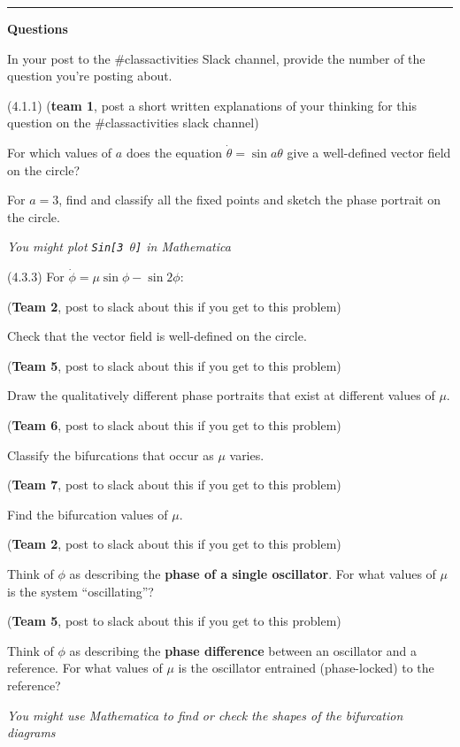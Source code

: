 \documentclass[12pt,letterpaper,noanswers]{exam}
\begin{document}
\vspace{0.2cm}

\hrule
\vspace{0.2cm}

\textbf{Questions}


In your post to the \#classactivities Slack channel, provide the number of the question you're posting about.
\begin{questions}
\item (4.1.1) 
(\textbf{team 1}, post a short written explanations of your thinking for this question on the \#classactivities slack channel)

For which values of $a$ does the equation $\dot{\theta} = \sin a\theta$ give a well-defined vector field on the circle?  

For $a = 3$, find and classify all the fixed points and sketch the phase portrait on the circle.  

\emph{You might plot \texttt{Sin[3 $\theta$]} in Mathematica}


\item (4.3.3) For $\dot{\phi} = \mu \sin \phi - \sin 2\phi$:
\begin{parts}
\item (\textbf{Team 2}, post to slack about this if you get to this problem)

Check that the vector field is well-defined on the circle.
\item (\textbf{Team 5}, post to slack about this if you get to this problem)

Draw the qualitatively different phase portraits that exist at different values of $\mu$.
\item (\textbf{Team 6}, post to slack about this if you get to this problem)

Classify the bifurcations that occur as $\mu$ varies.
\item (\textbf{Team 7}, post to slack about this if you get to this problem)

Find the bifurcation values of $\mu$. 
\item (\textbf{Team 2}, post to slack about this if you get to this problem)

Think of $\phi$ as describing the \textbf{phase of a single oscillator}.  For what values of $\mu$ is the system ``oscillating''?
\item (\textbf{Team 5}, post to slack about this if you get to this problem)

Think of $\phi$ as describing the \textbf{phase difference} between an oscillator and a reference.  For what values of $\mu$ is the oscillator entrained (phase-locked) to the reference?
\end{parts}

\emph{You might use Mathematica to find or check the shapes of the bifurcation diagrams}


\end{questions}
\end{document}
